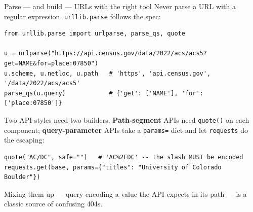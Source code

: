 \documentclass[9pt,aspectratio=169]{beamer}
\begin{document}
\begin{frame}[fragile]{Parse --- and build --- URLs with the right tool}
    Never parse a URL with a regular expression. \texttt{urllib.parse} follows the spec:
\begin{lstlisting}
from urllib.parse import urlparse, parse_qs, quote

u = urlparse("https://api.census.gov/data/2022/acs/acs5?get=NAME&for=place:07850")
u.scheme, u.netloc, u.path   # 'https', 'api.census.gov', '/data/2022/acs/acs5'
parse_qs(u.query)            # {'get': ['NAME'], 'for': ['place:07850']}
\end{lstlisting}
    Two API styles need two builders. \textbf{Path-segment} APIs need \texttt{quote()} on each component; \textbf{query-parameter} APIs take a \texttt{params=} dict and let \texttt{requests} do the escaping:
\begin{lstlisting}
quote("AC/DC", safe="")   # 'AC%2FDC' -- the slash MUST be encoded
requests.get(base, params={"titles": "University of Colorado Boulder"})
\end{lstlisting}
    Mixing them up --- query-encoding a value the API expects in its path --- is a classic source of confusing 404s.
\end{frame}
\end{document}
